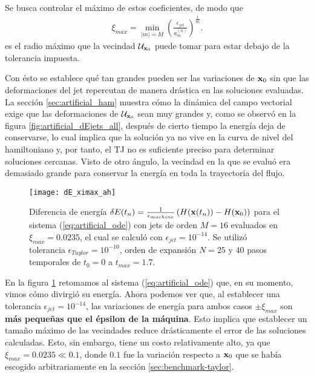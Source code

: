 Se busca controlar el máximo de estos coeficientes, de modo que 
\begin{align}
 \xi_{max} = \min_{|m|=M} \left( \frac{\epsilon_{jet}}{a_{m}^{(n)}} \right)^{\frac{1}{m}}.
 \label{eq:ximax}
\end{align}
es el radio máximo que la vecindad $\mathcal{U}_{\mathbf{x}_0}$ puede tomar para estar debajo de la tolerancia impuesta. 

Con ésto se establece qué tan grandes pueden ser las variaciones de $\mathbf{x}_0$ sin que las deformaciones del jet repercutan de manera drástica en las soluciones evaluadas. La sección \ref{sec:artificial_ham} muestra cómo la dinámica del campo vectorial exige que las deformaciones de $\mathcal{U}_{\mathbf{x}_0}$ sean muy grandes y, como se observó en la figura \ref{fig:artificial_dEjets_all}, después de cierto tiempo la energía deja de conservarse, lo cual implica que la solución ya no vive en la curva de nivel del hamiltoniano y, por tanto, el TJ no es suficiente preciso para determinar soluciones cercanas. Visto de otro ángulo, la vecindad en la que se evaluó era demasiado grande para conservar la energía en toda la trayectoria del flujo.

\begin{figure}[h!]
	\centering
	\texttt{[image: dE\_ximax\_ah]}
	\caption{Diferencia de energía $\delta E(t_n) = \frac{1}{\epsilon_{machine}} \left( H(\mathbf{x}(t_n)) - H(\mathbf{x}_0) \right)$ para el sistema (\ref{eq:artificial_ode}) con jets de orden $M=16$ evaluados en $\xi_{max} = 0.0235$, el cual se calculó con $\epsilon_{jet} = 10^{-14}$. Se utilizó tolerancia $\epsilon_{Taylor} = 10^{-10}$, orden de expansión $N = 25$ y $40$ pasos temporales de $t_0 = 0$ a $t_{max} = 1.7$.}
	\label{fig:dE_ximax_ah}
\end{figure}

En la figura \ref{fig:dE_ximax_ah} retomamos al sistema (\ref{eq:artificial_ode}) que, en su momento, vimos cómo divirgió su energía. Ahora podemos ver que, al establecer una tolerancia $\epsilon_{jet} = 10^{-14}$, las variaciones de energía para ambos casos $\pm \xi_{max}$ son \textbf{más pequeñas que el épsilon de la máquina}. Esto implica que establecer un tamaño máximo de las vecindades reduce drásticamente el error de las soluciones calculadas. Esto, sin embargo, tiene un costo relativamente alto, ya que $\xi_{max} = 0.0235 \ll 0.1$, donde $0.1$ fue la variación respecto a $\mathbf{x}_0$ que se había escogido arbitrariamente en la sección \ref{sec:benchmark-taylor}. 

